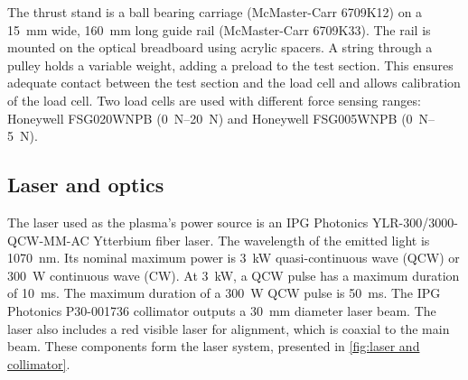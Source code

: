             The thrust stand is a ball bearing carriage (McMaster-Carr 6709K12) on a \qty{15}{mm} wide, \qty{160}{mm} long guide rail (McMaster-Carr 6709K33). The rail is mounted on the optical breadboard using acrylic spacers. A string through a pulley holds a variable weight, adding a preload to the test section. This ensures adequate contact between the test section and the load cell and allows calibration of the load cell. Two load cells are used with different force sensing ranges: Honeywell FSG020WNPB (\qtyrange{0}{20}{N}) and Honeywell FSG005WNPB (\qtyrange{0}{5}{N}).

        \subsection{Laser and optics}

            The laser used as the plasma's power source is an IPG Photonics YLR-300/3000-QCW-MM-AC Ytterbium fiber laser. The wavelength of the emitted light is \qty{1070}{nm}. Its nominal maximum power is \qty{3}{kW} quasi-continuous wave (QCW) or \qty{300}{W} continuous wave (CW). At \qty{3}{kW}, a QCW pulse has a maximum duration of \qty{10}{ms}. The maximum duration of a \qty{300}{W} QCW pulse is \qty{50}{ms}. The IPG Photonics P30-001736 collimator outputs a \qty{30}{mm} diameter laser beam. The laser also includes a red visible laser for alignment, which is coaxial to the main beam. These components form the laser system, presented in \autoref{fig:laser and collimator}.

